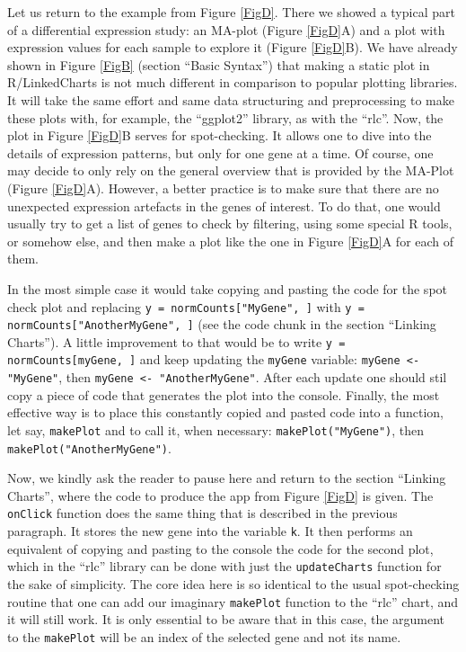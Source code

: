 \documentclass[twocolumn,10pt]{article}
\begin{document}
Let us return to the example from Figure \ref{FigD}. There we showed a typical part of a differential expression study: an MA-plot (Figure \ref{FigD}A) and a plot with expression values for each sample to explore it (Figure \ref{FigD}B). We have already shown in Figure \ref{FigB} (section ``Basic Syntax'') that making a static plot in R/LinkedCharts is not much different in comparison to popular plotting libraries. It will take the same effort and same data structuring and preprocessing to make these plots with, for example, the ``ggplot2'' library, as with the ``rlc''. Now, the plot in Figure \ref{FigD}B serves for spot-checking. It allows one to dive into the details of expression patterns, but only for one gene at a time. Of course, one may decide to only rely on the general overview that is provided by the MA-Plot (Figure \ref{FigD}A). However, a better practice is to make sure that there are no unexpected expression artefacts in the genes of interest. To do that, one would usually try to get a list of genes to check by filtering, using some special R tools, or somehow else, and then make a plot like the one in Figure \ref{FigD}A for each of them.

In the most simple case it would take copying and pasting the code for the spot check plot and replacing \texttt{y = normCounts["MyGene", ]} with \texttt{y = normCounts["AnotherMyGene", ]} (see the code chunk in the section ``Linking Charts''). A little improvement to that would be to write \texttt{y = normCounts[myGene, ]} and keep updating the \texttt{myGene} variable: \texttt{myGene <- "MyGene"}, then \texttt{myGene <- "AnotherMyGene"}. After each update one should stil copy a piece of code that generates the plot into the console. Finally, the most effective way is to place this constantly copied and pasted code into a function, let say, \texttt{makePlot} and to call it, when necessary: \texttt{makePlot("MyGene")}, then \texttt{makePlot("AnotherMyGene")}.

Now, we kindly ask the reader to pause here and return to the section ``Linking Charts'', where the code to produce the app from Figure \ref{FigD} is given. The \texttt{onClick} function does the same thing that is described in the previous paragraph. It stores the new gene into the variable \texttt{k}. It then performs an equivalent of copying and pasting to the console the code for the second plot, which in the ``rlc'' library can be done with just the \texttt{updateCharts} function for the sake of simplicity. The core idea here is so identical to the usual spot-checking routine that one can add our imaginary \texttt{makePlot} function to the ``rlc'' chart, and it will still work. It is only essential to be aware that in this case, the argument to the \texttt{makePlot} will be an index of the selected gene and not its name.
\end{document}

